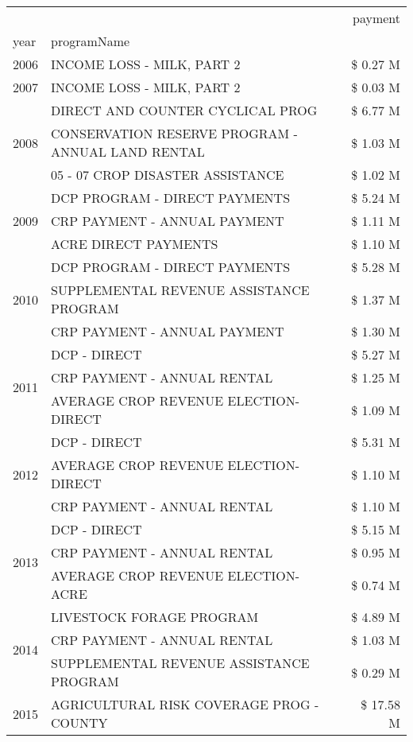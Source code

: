 \begin{tabular}{llr}
\toprule
 &  & payment \\
year & programName &  \\
\midrule
2006 & INCOME LOSS - MILK, PART 2 & \$ 0.27 M \\
\cline{1-3}
2007 & INCOME LOSS - MILK, PART 2 & \$ 0.03 M \\
\cline{1-3}
\multirow[t]{3}{*}{2008} & DIRECT AND COUNTER CYCLICAL PROG & \$ 6.77 M \\
 & CONSERVATION RESERVE PROGRAM - ANNUAL LAND RENTAL & \$ 1.03 M \\
 & 05 - 07 CROP DISASTER ASSISTANCE & \$ 1.02 M \\
\cline{1-3}
\multirow[t]{3}{*}{2009} & DCP PROGRAM - DIRECT PAYMENTS & \$ 5.24 M \\
 & CRP PAYMENT - ANNUAL PAYMENT & \$ 1.11 M \\
 & ACRE DIRECT PAYMENTS & \$ 1.10 M \\
\cline{1-3}
\multirow[t]{3}{*}{2010} & DCP PROGRAM - DIRECT PAYMENTS & \$ 5.28 M \\
 & SUPPLEMENTAL REVENUE ASSISTANCE PROGRAM & \$ 1.37 M \\
 & CRP PAYMENT - ANNUAL PAYMENT & \$ 1.30 M \\
\cline{1-3}
\multirow[t]{3}{*}{2011} & DCP - DIRECT & \$ 5.27 M \\
 & CRP PAYMENT - ANNUAL RENTAL & \$ 1.25 M \\
 & AVERAGE CROP REVENUE ELECTION-DIRECT & \$ 1.09 M \\
\cline{1-3}
\multirow[t]{3}{*}{2012} & DCP - DIRECT & \$ 5.31 M \\
 & AVERAGE CROP REVENUE ELECTION-DIRECT & \$ 1.10 M \\
 & CRP PAYMENT - ANNUAL RENTAL & \$ 1.10 M \\
\cline{1-3}
\multirow[t]{3}{*}{2013} & DCP - DIRECT & \$ 5.15 M \\
 & CRP PAYMENT - ANNUAL RENTAL & \$ 0.95 M \\
 & AVERAGE CROP REVENUE ELECTION-ACRE & \$ 0.74 M \\
\cline{1-3}
\multirow[t]{3}{*}{2014} & LIVESTOCK FORAGE PROGRAM & \$ 4.89 M \\
 & CRP PAYMENT - ANNUAL RENTAL & \$ 1.03 M \\
 & SUPPLEMENTAL REVENUE ASSISTANCE PROGRAM & \$ 0.29 M \\
\cline{1-3}
\multirow[t]{3}{*}{2015} & AGRICULTURAL RISK COVERAGE PROG - COUNTY & \$ 17.58 M \\

\end{tabular}
